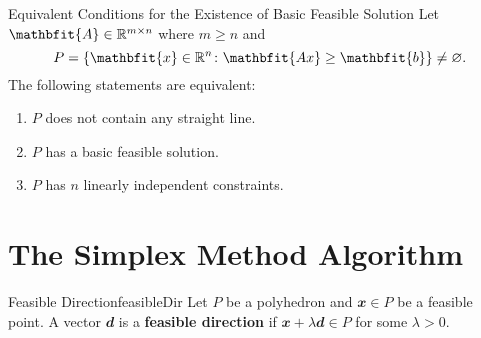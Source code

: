 \documentclass[math, code]{amznotes}
\theoremstyle{remark}
\begin{document}
\begin{thmbox}{\small Equivalent Conditions for the Existence of Basic Feasible Solution}{}
    Let $\mathbfit{A} \in \R^{m \times n}$ where $m \geq n$ and 
    \begin{equation*}
        P = \left\{\mathbfit{x} \in \R^n \colon \mathbfit{Ax} \geq \mathbfit{b}\right\} \neq \varnothing.
    \end{equation*}
    The following statements are equivalent:
    \begin{enumerate}
        \item $P$ does not contain any straight line.
        \item $P$ has a basic feasible solution.
        \item $P$ has $n$ linearly independent constraints.
    \end{enumerate}
\end{thmbox}

\section{The Simplex Method Algorithm}
\begin{dfnbox}{Feasible Direction}{feasibleDir}
    Let $P$ be a polyhedron and $\mathbfit{x} \in P$ be a feasible point. A vector $\mathbfit{d}$ is a {\color{red} \textbf{feasible direction}} if $\mathbfit{x} + \lambda\mathbfit{d} \in P$ for some $\lambda > 0$.
\end{dfnbox}
\end{document}
